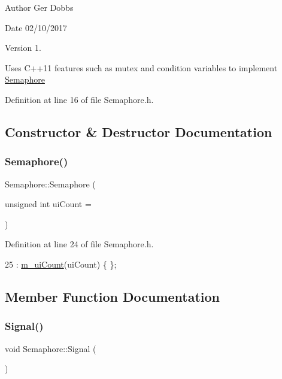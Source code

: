 \begin{DoxyAuthor}{Author}
Ger Dobbs 
\end{DoxyAuthor}
\begin{DoxyDate}{Date}
02/10/2017 
\end{DoxyDate}
\begin{DoxyVersion}{Version}
1.
\end{DoxyVersion}
Uses C++11 features such as mutex and condition variables to implement \hyperlink{classSemaphore}{Semaphore} 

Definition at line 16 of file Semaphore.\+h.



\subsection{Constructor \& Destructor Documentation}
\mbox{\label{classSemaphore_a0d9290d316636875ca85d1d78950a817}} 
\subsubsection{\texorpdfstring{Semaphore()}{Semaphore()}}
{\footnotesize\ttfamily Semaphore\+::\+Semaphore (\begin{DoxyParamCaption}\item[{unsigned int}]{ui\+Count = {} }\end{DoxyParamCaption})\hspace{0.3cm}{\ttfamily [inline]}}



Definition at line 24 of file Semaphore.\+h.


\begin{DoxyCode}
25           : \hyperlink{classSemaphore_a1456f105008b0c309f41211afbdd5fee}{m\_uiCount}(uiCount) \{ \};
\end{DoxyCode}


\subsection{Member Function Documentation}
\mbox{\label{classSemaphore_a86f92f738b4486439b296d8e235895f2}} 
\subsubsection{\texorpdfstring{Signal()}{Signal()}}
{\footnotesize\ttfamily void Semaphore\+::\+Signal (\begin{DoxyParamCaption}{ }\end{DoxyParamCaption})}



